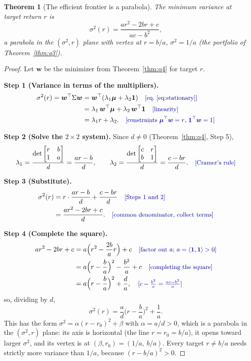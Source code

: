 \documentclass[11pt]{article}
\theoremstyle{plain}
\newtheorem{theorem}{Theorem}
\theoremstyle{definition}
\newcommand{\one}{\mathbf{1}}
\newcommand{\w}{\bm{w}}
\newcommand{\bmu}{\bm{\mu}}
\newcommand{\by}[1]{\quad\text{\small\color{blue!60!black}[#1]}}   %
\begin{document}
\begin{theorem}[The efficient frontier is a parabola]\label{thm:q5}
The minimum variance at target return $r$ is
\[
\sigma^2(r) = \frac{a r^2 - 2 b r + c}{ac-b^2},
\]
a parabola in the $(\sigma^2, r)$ plane with vertex at $r = b/a$, $\sigma^2 = 1/a$ (the portfolio of Theorem~\ref{thm:q3}).
\end{theorem}
\begin{proof}
Let $\w$ be the minimizer from Theorem~\ref{thm:q4} for target $r$.

\textbf{Step 1 (Variance in terms of the multipliers).}
\begin{align*}
\sigma^2(r) = \w^\top\Sigma\w &= \w^\top(\lambda_1\bmu + \lambda_2\one)
  \by{eq.~\eqref{eq:stationary}} \\
&= \lambda_1\,\w^\top\bmu + \lambda_2\,\w^\top\one
  \by{linearity} \\
&= \lambda_1 r + \lambda_2 .
  \by{constraints $\bmu^\top\w=r$, $\one^\top\w=1$}
\end{align*}

\textbf{Step 2 (Solve the $2\times2$ system).} Since $d\neq0$ (Theorem~\ref{thm:q4}, Step 5),
\[
\lambda_1 = \frac{\det\begin{bmatrix} r & b\\ 1 & a\end{bmatrix}}{d} = \frac{ar-b}{d},
\qquad
\lambda_2 = \frac{\det\begin{bmatrix} c & r\\ b & 1\end{bmatrix}}{d} = \frac{c-br}{d}.
\by{Cramer's rule}
\]

\textbf{Step 3 (Substitute).}
\begin{align*}
\sigma^2(r) &= r\cdot\frac{ar-b}{d} + \frac{c-br}{d}
  \by{Steps 1 and 2} \\
&= \frac{ar^2 - 2br + c}{d}.
  \by{common denominator, collect terms}
\end{align*}

\textbf{Step 4 (Complete the square).}
\begin{align*}
ar^2 - 2br + c &= a\Big(r^2 - \frac{2b}{a}r\Big) + c
  \by{factor out $a$; $a=\langle\one,\one\rangle>0$} \\
&= a\Big(r-\frac{b}{a}\Big)^2 - \frac{b^2}{a} + c
  \by{completing the square} \\
&= a\Big(r-\frac{b}{a}\Big)^2 + \frac{d}{a},
  \by{$c-\tfrac{b^2}{a}=\tfrac{ac-b^2}{a}$}
\end{align*}
so, dividing by $d$,
\[
\sigma^2(r) = \frac{a}{d}\Big(r-\frac{b}{a}\Big)^2 + \frac{1}{a}.
\]
This has the form $\sigma^2 = \alpha(r-r_0)^2+\beta$ with $\alpha=a/d>0$, which is a parabola in the $(\sigma^2,r)$ plane: its axis is horizontal (the line $r=r_0=b/a$), it opens toward larger $\sigma^2$, and its vertex is at $(\beta,r_0)=(1/a,\ b/a)$.\by{standard form of a parabola}
Every target $r\neq b/a$ needs strictly more variance than $1/a$, because $(r-b/a)^2>0$.


\end{proof}
\end{document}
